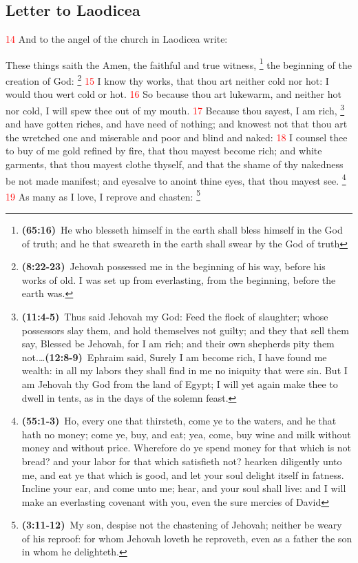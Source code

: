 \documentclass[12pt,twoside]{memoir}
\newcommand{\cbibleref}[3]{\textbf{\ibibleverse[textit]{#1}(#2)}\ {#3}}
\newcommand{\cbiblefoot}[3]{\footnote{\cbibleref{#1}{#2}{#3}}}
\newcommand{\cbiblefootduo}[6]{\footnote{\cbibleref{#1}{#2}{#3}\ldots \cbibleref{#4}{#5}{#6}}}
\newcommand{\vnum}[1]{\textcolor{red}{\normalsize{#1}}}
\begin{document}
\subsection*{Letter to Laodicea}
\vnum{14} And to the angel of the church in Laodicea write:

These things saith the Amen, the faithful and true witness,%
	\cbiblefoot{Isaiah}{65:16}{He who blesseth himself in the earth shall bless himself in the God of truth; and he that sweareth in the earth shall swear by the God of truth}
 the beginning of the creation of God:%
 	\cbiblefoot{Proverbs}{8:22-23}{Jehovah possessed me in the beginning of his way, before his works of old. I was set up from everlasting, from the beginning, before the earth was.} %
\vnum{15} I know thy works, that thou art neither cold nor hot: I would thou wert cold or hot. %
\vnum{16} So because thou art lukewarm, and neither hot nor cold, I will spew thee out of my mouth. %
\vnum{17} Because thou sayest, I am rich,%
	\cbiblefootduo{Zechariah}{11:4-5}{Thus said Jehovah my God: Feed the flock of slaughter; whose possessors slay them, and hold themselves not guilty; and they that sell them say, Blessed be Jehovah, for I am rich; and their own shepherds pity them not.}	
				{Hosea}{12:8-9}{Ephraim said, Surely I am become rich, I have found me wealth: in all my labors they shall find in me no iniquity that were sin. But I am Jehovah thy God from the land of Egypt; I will yet again make thee to dwell in tents, as in the days of the solemn feast.}
 and have gotten riches, and have need of nothing; and knowest not that thou art the wretched one and miserable and poor and blind and naked: %
\vnum{18} I counsel thee to buy of me gold refined by fire, that thou mayest become rich; and white garments, that thou mayest clothe thyself, and that the shame of thy nakedness be not made manifest; and eyesalve to anoint thine eyes, that thou mayest see.%
	\cbiblefoot{Isaiah}{55:1-3}{Ho, every one that thirsteth, come ye to the waters, and he that hath no money; come ye, buy, and eat; yea, come, buy wine and milk without money and without price. Wherefore do ye spend money for that which is not bread? and your labor for that which satisfieth not? hearken diligently unto me, and eat ye that which is good, and let your soul delight itself in fatness. Incline your ear, and come unto me; hear, and your soul shall live: and I will make an everlasting covenant with you, even the sure mercies of David} %
\vnum{19} As many as I love, I reprove and chasten:%
	\cbiblefoot{Proverbs}{3:11-12}{My son, despise not the chastening of Jehovah; neither be weary of his reproof: for whom Jehovah loveth he reproveth, even as a father the son in whom he delighteth.}
\end{document}

